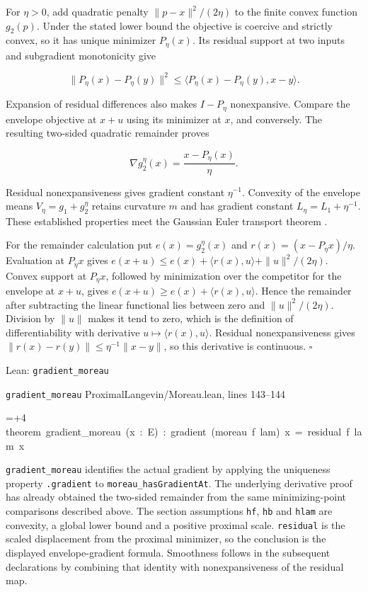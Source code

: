 \documentclass[11pt,a4paper]{article}
\newlength{\leancharwidth}
\newenvironment{leancode}{\par\smallskip\begingroup\ttfamily\footnotesize\raggedright
  \settowidth{\leancharwidth}{M}\setlength{\parskip}{0pt}\setlength{\parindent}{0pt}
  \frenchspacing}{\par\endgroup\smallskip}
\newcommand{\leanline}[2]{\hangindent=\dimexpr#1\leancharwidth+4\leancharwidth\relax
  \hangafter=1\noindent\hspace*{#1\leancharwidth}#2\par}
\newcommand{\leansource}[1]{\par{\footnotesize\color{leanmuted}#1}\par}
\newcommand{\leanlabel}[1]{\par\smallskip\noindent{\small\bfseries #1}\par}
\begin{document}
For \(\eta>0\), add quadratic penalty \(\|p-x\|^2/(2\eta)\) to the finite convex function \(g_2(p)\). Under the stated lower bound the objective is coercive and strictly convex, so it has unique minimizer \(P_\eta(x)\). Its residual support at two inputs and subgradient monotonicity give

\[\|P_\eta(x)-P_\eta(y)\|^2\le
\langle P_\eta(x)-P_\eta(y),x-y\rangle.\]

Expansion of residual differences also makes \(I-P_\eta\) nonexpansive. Compare the envelope objective at \(x+u\) using its minimizer at \(x\), and conversely. The resulting two-sided quadratic remainder proves

\[\nabla g_2^\eta(x)=\frac{x-P_\eta(x)}\eta.\]

Residual nonexpansiveness gives gradient constant \(\eta^{-1}\). Convexity of the envelope means \(V_\eta=g_1+g_2^\eta\) retains curvature \(m\) and has gradient constant \(L_\eta=L_1+\eta^{-1}\). These established properties meet the Gaussian Euler transport theorem \cite[Section~3.45.7]{LangevinLean2026ULASC}.




For the remainder calculation put \(e(x)=g_2^\eta(x)\) and \(r(x)=(x-P_\eta x)/\eta\). Evaluation at \(P_\eta x\) gives \(e(x+u)\le e(x)+\langle r(x),u\rangle+\|u\|^2/(2\eta)\). Convex support at \(P_\eta x\), followed by minimization over the competitor for the envelope at \(x+u\), gives \(e(x+u)\ge e(x)+\langle r(x),u\rangle\). Hence the remainder after subtracting the linear functional lies between zero and \(\|u\|^2/(2\eta)\). Division by \(\|u\|\) makes it tend to zero, which is the definition of differentiability with derivative \(u\mapsto\langle r(x),u\rangle\). Residual nonexpansiveness gives \(\|r(x)-r(y)\|\le\eta^{-1}\|x-y\|\), so this derivative is continuous. \(\square\)

\begin{leanbox}{Lean: \texttt{gradient\_\allowbreak{}moreau}}
\leansource{\texttt{gradient\_\allowbreak{}moreau} \quad ProximalLangevin/\allowbreak{}Moreau.lean, lines 143–144}
\begin{leancode}
\leanline{0}{theorem\ gradient\_moreau\ (x\ :\ E)\ :\ gradient\ (moreau\ f\ lam)\ x\ =\ residual\ f\ lam\ x}
\end{leancode}
\leanlabel{How the Lean proof follows the argument}
\texttt{gradient\_\allowbreak{}moreau} identifies the actual gradient by applying the uniqueness property \texttt{.\allowbreak{}gradient} to \texttt{moreau\_\allowbreak{}has\allowbreak{}Gradient\allowbreak{}At}. The underlying derivative proof has already obtained the two-sided remainder from the same minimizing-point comparisons described above. The section assumptions \texttt{hf}, \texttt{hb} and \texttt{hlam} are convexity, a global lower bound and a positive proximal scale. \texttt{residual} is the scaled displacement from the proximal minimizer, so the conclusion is the displayed envelope-gradient formula. Smoothness follows in the subsequent declarations by combining that identity with nonexpansiveness of the residual map.
\end{leanbox}
\end{document}

